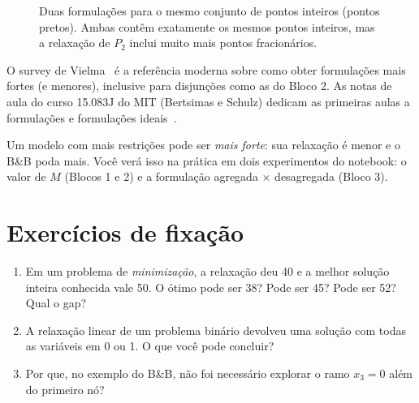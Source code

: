 \begin{figure}[H]
\centering
{}
\caption{Duas formulações para o mesmo conjunto de pontos inteiros (pontos pretos). Ambas contêm exatamente os
mesmos pontos inteiros, mas a relaxação de $P_2$ inclui muito mais pontos fracionários.}
\end{figure}

\begin{outros}
O survey de Vielma~\cite{vielma2015} é a referência moderna sobre como obter formulações mais fortes (e menores),
inclusive para disjunções como as do Bloco 2. As notas de aula do curso 15.083J do MIT (Bertsimas e Schulz) dedicam
as primeiras aulas a formulações e formulações ideais~\cite{ocw15083}.
\end{outros}

\begin{atencao}
Um modelo com mais restrições pode ser \emph{mais forte}: sua relaxação é menor e o B\&B poda mais. Você verá isso
na prática em dois experimentos do notebook: o valor de $M$ (Blocos 1 e 2) e a formulação agregada
$\times$ desagregada (Bloco 3).
\end{atencao}

\section*{Exercícios de fixação}
\begin{enumerate}[label=\textbf{3.\arabic*}]
  \item Em um problema de \emph{minimização}, a relaxação deu 40 e a melhor solução inteira conhecida vale 50. O
  ótimo pode ser 38? Pode ser 45? Pode ser 52? Qual o gap?
  \item A relaxação linear de um problema binário devolveu uma solução com todas as variáveis em 0 ou 1. O que você
  pode concluir?
  \item Por que, no exemplo do B\&B, não foi necessário explorar o ramo $x_3=0$ além do primeiro nó?
\end{enumerate}

